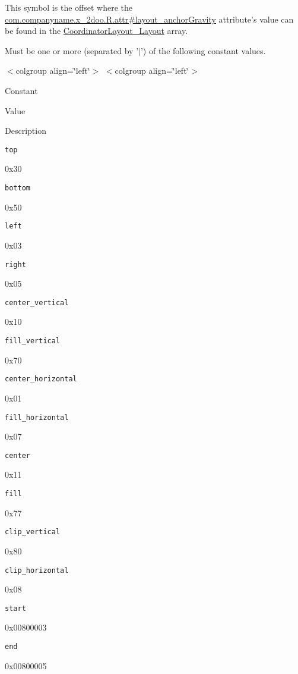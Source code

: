This symbol is the offset where the \hyperlink{classcom_1_1companyname_1_1x__2doo_1_1_r_1_1attr_13af8ea6287e01914090146ec92099f0}{com.companyname.x\_\-2doo.R.attr\#layout\_\-anchorGravity} attribute's value can be found in the \hyperlink{classandroid_1_1support_1_1v4_1_1_r_1_1styleable_002d98b0482bfb71440db629b16e17bf}{CoordinatorLayout\_\-Layout} array.

Must be one or more (separated by '$|$') of the following constant values. \begin{TabularC}{0}
\hline
\end{TabularC}
$<$colgroup align=\char`\"{}left\char`\"{}$>$ $<$colgroup align=\char`\"{}left\char`\"{}$>$ 

Constant

Value

Description 

{\tt top}

0x30

{\tt bottom}

0x50

{\tt left}

0x03

{\tt right}

0x05

{\tt center\_\-vertical}

0x10

{\tt fill\_\-vertical}

0x70

{\tt center\_\-horizontal}

0x01

{\tt fill\_\-horizontal}

0x07

{\tt center}

0x11

{\tt fill}

0x77

{\tt clip\_\-vertical}

0x80

{\tt clip\_\-horizontal}

0x08

{\tt start}

0x00800003

{\tt end}

0x00800005

